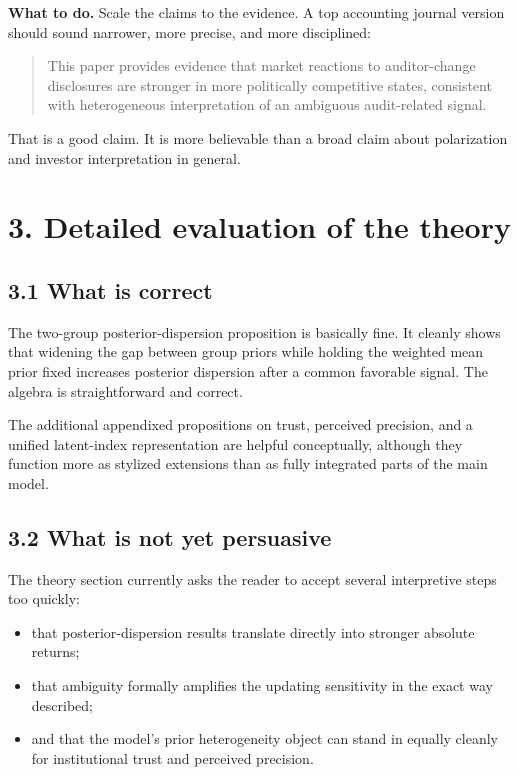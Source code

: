 \textbf{What to do.} Scale the claims to the evidence. A top accounting journal version should sound narrower, more precise, and more disciplined:
\begin{quote}
This paper provides evidence that market reactions to auditor-change disclosures are stronger in more politically competitive states, consistent with heterogeneous interpretation of an ambiguous audit-related signal.
\end{quote}
That is a good claim. It is more believable than a broad claim about polarization and investor interpretation in general.

\section*{3. Detailed evaluation of the theory}

\subsection*{3.1 What is correct}

The two-group posterior-dispersion proposition is basically fine. It cleanly shows that widening the gap between group priors while holding the weighted mean prior fixed increases posterior dispersion after a common favorable signal. The algebra is straightforward and correct.

The additional appendixed propositions on trust, perceived precision, and a unified latent-index representation are helpful conceptually, although they function more as stylized extensions than as fully integrated parts of the main model.

\subsection*{3.2 What is not yet persuasive}

The theory section currently asks the reader to accept several interpretive steps too quickly:
\begin{itemize}[leftmargin=1.5em]
    \item that posterior-dispersion results translate directly into stronger absolute returns;
    \item that ambiguity formally amplifies the updating sensitivity in the exact way described;
    \item and that the model's prior heterogeneity object can stand in equally cleanly for institutional trust and perceived precision.
\end{itemize}

